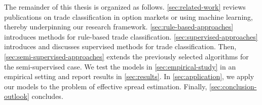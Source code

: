 The remainder of this thesis is organized as follows. \cref{sec:related-work} reviews publications on trade classification in option markets or using machine learning, thereby underpinning our research framework. \cref{sec:rule-based-approaches} introduces methods for rule-based trade classification. \cref{sec:supervised-approaches} introduces and discusses supervised methods for trade classification. Then, \cref{sec:semi-supervised-approaches} extends the previously selected algorithms for the semi-supervised case. We test the models in \cref{sec:empirical-study} in an empirical setting and report results in \cref{sec:results}. In \cref{sec:application}, we apply our models to the problem of effective spread estimation. Finally, \cref{sec:conclusion-outlook} concludes.
